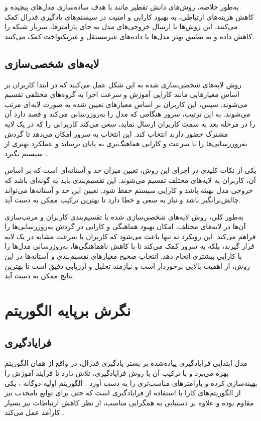 به‌طور خلاصه، روش‌های دانش تقطیر مانند
با هدف ساده‌سازی مدل‌های پیچیده و کاهش هزینه‌های ارتباطی، به بهبود کارایی و امنیت در سیستم‌های یادگیری فدرال کمک می‌کنند. این روش‌ها با ارسال خروجی‌های مدل به جای پارامترها، سربار شبکه را کاهش داده و به تطبیق بهتر مدل‌ها با داده‌های غیرمستقل و غیریکنواخت کمک می‌کنند.


\subsection{
	لایه‌های شخصی‌سازی%
}
روش لایه‌های شخصی‌سازی شده به این شکل عمل می‌کنند که در ابتدا کاربران بر اساس معیارهایی مانند کارایی آموزش و سرعت اجرا به گروه‌های مختلفی تقسیم می‌شوند. سپس، این کاربران بر اساس معیارهای تعیین شده به صورت لایه‌ای مرتب می‌شوند. به این ترتیب، سرور هنگامی که مدل را به‌روزرسانی می‌کند و قصد دارد آن را در مرحله بعد به سمت کاربران ارسال نماید، سعی می‌کند کاربرانی را که در یک لایه مشترک حضور دارند انتخاب کند. این انتخاب به سرور امکان می‌دهد تا گردش به‌روزرسانی‌ها را با سرعت و کارایی هماهنگ‌تری به پایان برساند و عملکرد بهتری از سیستم بگیرد
\cite{chai2020tifl}.

یکی از نکات کلیدی در اجرای این روش، تعیین میزان حد و آستانه‌ای است که بر اساس آن، کاربران به لایه‌های مختلف تقسیم می‌شوند. این تقسیم‌بندی باید به گونه‌ای باشد که خروجی مدل بهینه باشد و کارایی سیستم حفظ شود. تعیین این حد و آستانه‌ها می‌تواند چالش‌برانگیز باشد و نیاز به سعی و خطا دارد تا بهترین ترکیب ممکن به دست آید.

به‌طور کلی، روش لایه‌های شخصی‌سازی شده با تقسیم‌بندی کاربران و مرتب‌سازی آن‌ها در لایه‌های مختلف، امکان بهبود هماهنگی و کارایی در گردش به‌روزرسانی‌ها را فراهم می‌کند. این رویکرد نه تنها باعث می‌شود که کاربران با سرعت مشابه در یک لایه قرار گیرند، بلکه به سرور کمک می‌کند تا با کاهش ناهماهنگی‌ها، به‌روزرسانی مدل‌ها را با کارایی بیشتری انجام دهد. انتخاب صحیح معیارهای تقسیم‌بندی و آستانه‌ها در این روش، از اهمیت بالایی برخوردار است و نیازمند تحلیل و ارزیابی دقیق است تا بهترین نتایج ممکن به دست آید.




\section{نگرش برپایه الگوریتم}
\subsection{فرایادگیری}
مدل ابتدایی فرایادگیری پیاده‌شده بر بستر یادگیری فدرال، در واقع از همان الگوریتم
بهره می‌برد و با ترکیب آن با روش فرایادگیری، تلاش دارد تا فرایند آموزش را بهینه‌سازی کرده و پارامترهای مناسب‌تری را به دست آورد
\cite{jiang2019improving}.
الگوریتم اولیه-دوگانه%
%
، یکی از الگوریتم‌های کارا با استفاده از فرایادگیری است که حتی برای توابع نامحدب%
نیز مقاوم بوده و علاوه بر دستیابی به همگرایی مناسب، از نظر کاهش ارتباطات نیز بسیار کارآمد عمل می‌کند
\cite{zhang2021fedpd}.


